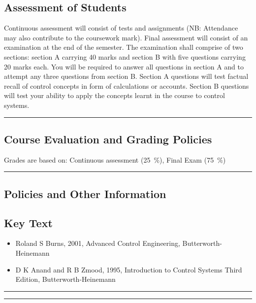\subsection*{Assessment of Students}
\begin{outline}
    \1 Continuous assessment will consist of tests and assignments (NB: Attendance may also contribute to the coursework mark).
    \1 Final assessment will consist of an examination at the end of the semester. The examination shall comprise of two sections: section A carrying 40 marks and section B with five questions carrying 20 marks each. You will be required to answer all questions in section A and to attempt any three questions from section B. Section A questions will test factual recall of control concepts in form of calculations or accounts. Section B questions will test your ability to apply the concepts learnt in the course to control systems.
\end{outline}
\vspace{2ex}\hrule\vspace{2ex}

\subsection*{Course Evaluation and Grading Policies}
Grades are based on:
Continuous assessment (\qty{25}{\percent}),
Final Exam (\qty{75}{\percent})
\vspace{2ex}\hrule\vspace{2ex}


\subsection*{Policies and Other Information}
\subsection*{Key Text}

\begin{itemize}
    \item Roland S Burns, 2001, Advanced Control Engineering, Butterworth-Heinemann
    \item D K Anand and R B Zmood, 1995, Introduction to Control Systems Third Edition, Butterworth-Heinemann
\end{itemize}
\vspace{2ex}\hrule
\vspace{2ex}\hrule\vspace{2ex}